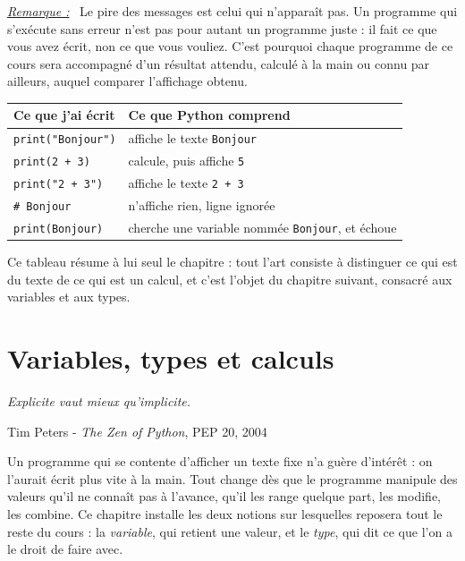 \documentclass[a4paper,11pt,openany]{book}
\newcommand{\code}[1]{\texttt{\textcolor{codebleu}{#1}}}
\newenvironment{remarque}%
 {\par\vspace{1mm}\begin{list}{}{\leftmargin=1cm \rightmargin=0.5cm}\item[]%
  \textit{\underline{Remarque :}}~}%
 {\end{list}\vspace{1mm}}
\newcommand{\epigraphe}[2]{%
  \begin{list}{}{\leftmargin=1cm \rightmargin=1cm}\item[]
  \small\textit{#1}
  \end{list}
  \nopagebreak
  \hfill\small #2 \par\vspace{4mm}}
\begin{document}
\begin{remarque}
Le pire des messages est celui qui n'apparaît pas. Un programme qui s'exécute sans erreur n'est pas pour autant un programme juste : il fait ce que vous avez écrit, non ce que vous vouliez. C'est pourquoi chaque programme de ce cours sera accompagné d'un résultat attendu, calculé à la main ou connu par ailleurs, auquel comparer l'affichage obtenu.
\end{remarque}

\bigskip

\begin{center}
\begin{tabular}{|>{\columncolor{orange!50}}l|l|}
\hline
\rowcolor{orange!50} \textbf{Ce que j'ai écrit} & \textbf{Ce que Python comprend} \\
\hline
\code{print("Bonjour")} & affiche le texte \code{Bonjour} \\
\hline
\code{print(2 + 3)} & calcule, puis affiche \code{5} \\
\hline
\code{print("2 + 3")} & affiche le texte \code{2 + 3} \\
\hline
\code{\# Bonjour} & n'affiche rien, ligne ignorée \\
\hline
\code{print(Bonjour)} & cherche une variable nommée \code{Bonjour}, et échoue \\
\hline
\end{tabular}
\end{center}

Ce tableau résume à lui seul le chapitre : tout l'art consiste à distinguer ce qui est du texte de ce qui est un calcul, et c'est l'objet du chapitre suivant, consacré aux variables et aux types.
\chapter{Variables, types et calculs}

\epigraphe{Explicite vaut mieux qu'implicite.}{Tim Peters - \emph{The Zen of Python}, PEP 20, 2004}

Un programme qui se contente d'afficher un texte fixe n'a guère d'intérêt : on l'aurait écrit plus vite à la main. Tout change dès que le programme manipule des valeurs qu'il ne connaît pas à l'avance, qu'il les range quelque part, les modifie, les combine. Ce chapitre installe les deux notions sur lesquelles reposera tout le reste du cours : la \emph{variable}, qui retient une valeur, et le \emph{type}, qui dit ce que l'on a le droit de faire avec.
\end{document}
